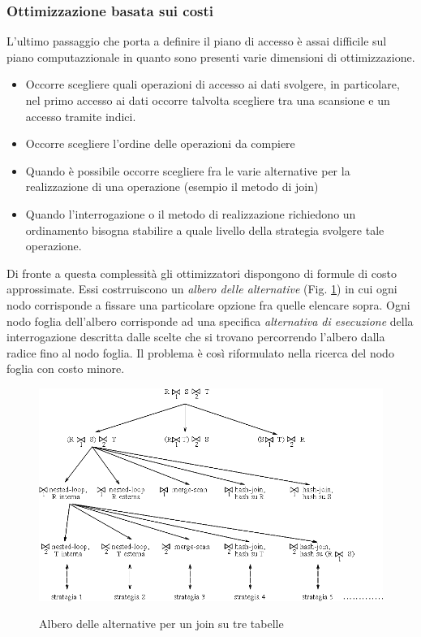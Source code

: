  \subsubsection{Ottimizzazione basata sui costi}
 L'ultimo passaggio che porta a definire il piano di accesso è assai difficile sul piano computazzionale in quanto sono presenti varie dimensioni di ottimizzazione.
 \begin{itemize}
   \item Occorre scegliere quali operazioni di accesso ai dati svolgere, in particolare, nel primo accesso ai dati occorre talvolta scegliere tra una scansione e un accesso tramite indici. 
   \item Occorre scegliere l'ordine delle operazioni da compiere
   \item Quando è possibile occorre scegliere fra le varie alternative per la realizzazione di una operazione (esempio il metodo di join)
   \item Quando l'interrogazione o il metodo di realizzazione richiedono un ordinamento bisogna stabilire a quale livello della strategia svolgere tale operazione.
 \end{itemize}
 Di fronte a questa complessità gli ottimizzatori dispongono di formule di costo approssimate. Essi costrruiscono un \emph{albero delle alternative} (Fig. \ref{fig:alterna}) in cui ogni nodo corrisponde a fissare una particolare opzione fra quelle elencare sopra. Ogni nodo foglia dell'albero corrisponde ad una specifica \emph{alternativa di esecuzione} della interrogazione descritta dalle scelte che si trovano percorrendo l'albero dalla radice fino al nodo foglia. Il problema è così riformulato nella ricerca del nodo foglia con costo minore.\\
\begin{figure}
  \centering
  \includegraphics[width=12cm]{img/alterna.png}\\
  \caption{Albero delle alternative per un join su tre tabelle}\label{fig:alterna}
\end{figure}
